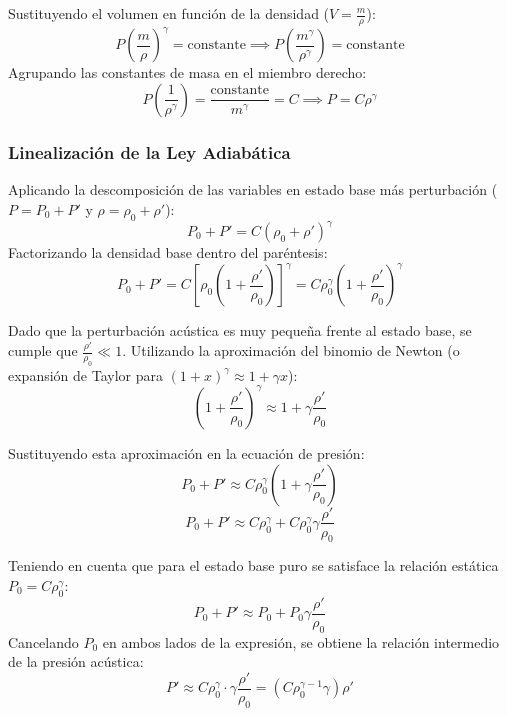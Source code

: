 \documentclass[11pt,letterpaper]{article}
\begin{document}
Sustituyendo el volumen en función de la densidad ($V = \frac{m}{\rho}$):
\begin{equation}
    P \left(\frac{m}{\rho}\right)^\gamma = \text{constante} \implies P \left(\frac{m^\gamma}{\rho^\gamma}\right) = \text{constante}
\end{equation}
Agrupando las constantes de masa en el miembro derecho:
\begin{equation}
    P \left(\frac{1}{\rho^\gamma}\right) = \frac{\text{constante}}{m^\gamma} = C \implies P = C \rho^\gamma
\end{equation}

\subsubsection{Linealización de la Ley Adiabática}
Aplicando la descomposición de las variables en estado base más perturbación ($P = P_0 + P'$ y $\rho = \rho_0 + \rho'$):
\begin{equation}
    P_0 + P' = C (\rho_0 + \rho')^\gamma
\end{equation}
Factorizando la densidad base dentro del paréntesis:
\begin{equation}
    P_0 + P' = C \left[ \rho_0 \left( 1 + \frac{\rho'}{\rho_0} \right) \right]^\gamma = C \rho_0^\gamma \left( 1 + \frac{\rho'}{\rho_0} \right)^\gamma
\end{equation}

Dado que la perturbación acústica es muy pequeña frente al estado base, se cumple que $\frac{\rho'}{\rho_0} \ll 1$. Utilizando la aproximación del binomio de Newton (o expansión de Taylor para $(1+x)^\gamma \approx 1 + \gamma x$):
\begin{equation}
    \left( 1 + \frac{\rho'}{\rho_0} \right)^\gamma \approx 1 + \gamma \frac{\rho'}{\rho_0}
\end{equation}

Sustituyendo esta aproximación en la ecuación de presión:
\begin{equation}
    P_0 + P' \approx C \rho_0^\gamma \left( 1 + \gamma \frac{\rho'}{\rho_0} \right)
\end{equation}
\begin{equation}
    P_0 + P' \approx C \rho_0^\gamma + C \rho_0^\gamma \gamma \frac{\rho'}{\rho_0}
\end{equation}

Teniendo en cuenta que para el estado base puro se satisface la relación estática $P_0 = C \rho_0^\gamma$:
\begin{equation}
    P_0 + P' \approx P_0 + P_0 \gamma \frac{\rho'}{\rho_0}
\end{equation}
Cancelando $P_0$ en ambos lados de la expresión, se obtiene la relación intermedio de la presión acústica:
\begin{equation}
    P' \approx C \rho_0^\gamma \cdot \gamma \frac{\rho'}{\rho_0} = \left( C \rho_0^{\gamma-1} \gamma \right) \rho'
\end{equation}
\end{document}
